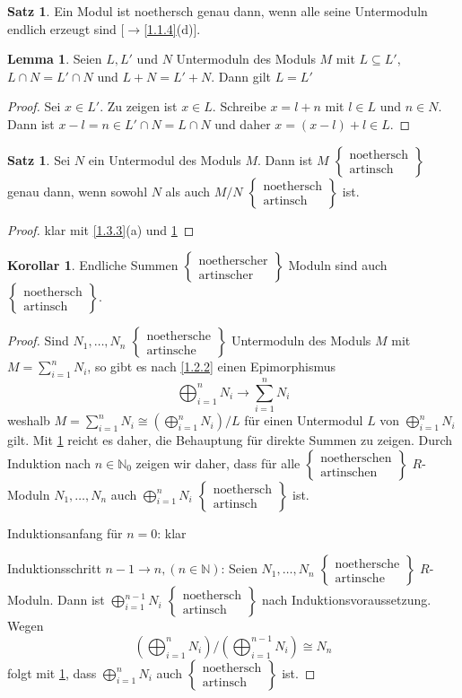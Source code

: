 \documentclass[
twoside=semi,
fontsize=12,
DIV=12, 
cleardoublepage=current,
leqno,
headings=optiontoheadandtoc, 
toc=idx
]{scrbook}
\newcommand{\N}{\mathbb{N}}
\newcommand{\brac}[1]{\left( #1 \right)}
\newcommand{\textcase}[2]{$\begin{Bmatrix} \textrm{#1} \\ \textrm{#2}\end{Bmatrix}$}
\theoremstyle{definition}
\newtheorem{satz}[definition]{Satz}
\newtheorem{lemma}[definition]{Lemma}
\newtheorem{korollar}[definition]{Korollar}
\begin{document}
	\begin{satz}\label{1.4.3}\hfill\newline
		Ein Modul ist noethersch genau dann, wenn alle seine Untermoduln endlich erzeugt sind [$\rightarrow$\ref{1.1.4}(d)].
	\end{satz}

	\begin{lemma}\label{1.4.4}\hfill\newline
		Seien $L, L'$ und $N$ Untermoduln des Moduls $M$ mit $L \subseteq L'$, $L \cap N = L' \cap N$ und $L+N=L'+N$. Dann gilt $L=L'$
		
		\begin{proof}
			Sei $x \in L'$. Zu zeigen ist $x \in L$. Schreibe $x = l + n$ mit $l \in L$ und $n \in N$. Dann ist $x-l = n \in L' \cap N = L \cap N$ und daher $x = (x-l)+l \in L$. 
		\end{proof}
	\end{lemma}

	\begin{satz}\label{1.4.5}\hfill\newline
		Sei $N$ ein Untermodul des Moduls $M$. Dann ist $M$ \textcase{noethersch}{artinsch} genau dann, wenn sowohl $N$ als auch $M/N$ \textcase{noethersch}{artinsch} ist.
		
		\begin{proof}
			klar mit \ref{1.3.3}(a) und \ref{1.4.4}
		\end{proof}
	\end{satz}

	\begin{korollar}\label{1.4.6}\hfill\newline
		Endliche Summen \textcase{noetherscher}{artinscher} Moduln sind auch \textcase{noethersch}{artinsch}.
		
		\begin{proof}
			Sind $N_1, \dots, N_n$ \textcase{noethersche}{artinsche} Untermoduln des Moduls $M$ mit $M = \sum_{i=1}^n N_i$, so gibt es nach \ref{1.2.2} einen Epimorphismus 
				\[\bigoplus_{i=1}^n N_i \to \sum_{i=1}^n N_i\]
			weshalb $M = \sum_{i=1}^nN_i \cong \brac{\bigoplus_{i=1}^n N_i} / L$ f\"ur einen Untermodul $L$ von $\bigoplus_{i=1}^nN_i$ gilt.\newline
			Mit \ref{1.4.5} reicht es daher, die Behauptung f\"ur direkte Summen zu zeigen.\newline
			Durch Induktion nach $n \in \N_0$ zeigen wir daher, dass f\"ur alle \textcase{noetherschen}{artinschen} $R$-Moduln $N_1, \dots, N_n$ auch $\bigoplus_{i=1}^n N_i$ \textcase{noethersch}{artinsch} ist.
			
			\noindent Induktionsanfang f\"ur $n = 0$: klar
			
			\noindent Induktionsschritt $n-1 \to n, (n \in \N)$: Seien $N_1, \dots, N_n$ \textcase{noethersche}{artinsche} $R$-Moduln. Dann ist $\bigoplus_{i=1}^{n-1} N_i$ \textcase{noethersch}{artinsch} nach Induktionsvoraussetzung. Wegen 
				\[\brac{\bigoplus_{i=1}^n N_i} / \brac{\bigoplus_{i=1}^{n-1} N_i} \cong N_n\]
			folgt mit \ref{1.4.5}, dass $\bigoplus_{i=1}^n N_i$ auch \textcase{noethersch}{artinsch} ist.
		\end{proof}
	\end{korollar}
\end{document}

